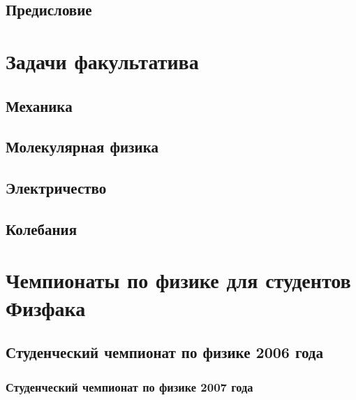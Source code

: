 \documentclass[a5paper, oneside]{book}
\begin{document}
\tableofcontents    %


\chapter*{Предисловие} 





\part{Задачи факультатива}

\chapter{Механика}









\chapter{Молекулярная физика}




\chapter{Электричество}





\chapter{Колебания}




\part{Чемпионаты по физике для студентов Физфака}

\chapter{Студенческий чемпионат по физике 2006 года}


\section*{Студенческий чемпионат по физике 2007 года}

\end{document}
